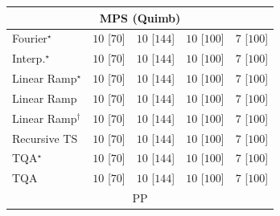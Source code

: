 \begin{tabular}{l|cccc|}
\cline{1-5}
\multicolumn{5}{c}{\rule{0pt}{8pt}MPS (Quimb)} \\
\midrule
Fourier$^\star$ & {\cellcolor[HTML]{00441B}} \color[HTML]{F1F1F1} $10$ [$70$] & {\cellcolor[HTML]{00441B}} \color[HTML]{F1F1F1} $10$ [$144$] & {\cellcolor[HTML]{00441B}} \color[HTML]{F1F1F1} $10$ [$100$] & {\cellcolor[HTML]{F7FCF5}} \color[HTML]{000000} $7$ [$100$] \\
Interp.$^\star$ & {\cellcolor[HTML]{00441B}} \color[HTML]{F1F1F1} $10$ [$70$] & {\cellcolor[HTML]{00441B}} \color[HTML]{F1F1F1} $10$ [$144$] & {\cellcolor[HTML]{00441B}} \color[HTML]{F1F1F1} $10$ [$100$] & {\cellcolor[HTML]{F7FCF5}} \color[HTML]{000000} $7$ [$100$] \\
Linear Ramp$^\star$ & {\cellcolor[HTML]{00441B}} \color[HTML]{F1F1F1} $10$ [$70$] & {\cellcolor[HTML]{00441B}} \color[HTML]{F1F1F1} $10$ [$144$] & {\cellcolor[HTML]{00441B}} \color[HTML]{F1F1F1} $10$ [$100$] & {\cellcolor[HTML]{F7FCF5}} \color[HTML]{000000} $7$ [$100$] \\
Linear Ramp & {\cellcolor[HTML]{00441B}} \color[HTML]{F1F1F1} $10$ [$70$] & {\cellcolor[HTML]{00441B}} \color[HTML]{F1F1F1} $10$ [$144$] & {\cellcolor[HTML]{00441B}} \color[HTML]{F1F1F1} $10$ [$100$] & {\cellcolor[HTML]{F7FCF5}} \color[HTML]{000000} $7$ [$100$] \\
Linear Ramp$^\dagger$ & {\cellcolor[HTML]{00441B}} \color[HTML]{F1F1F1} $10$ [$70$] & {\cellcolor[HTML]{00441B}} \color[HTML]{F1F1F1} $10$ [$144$] & {\cellcolor[HTML]{00441B}} \color[HTML]{F1F1F1} $10$ [$100$] & {\cellcolor[HTML]{F7FCF5}} \color[HTML]{000000} $7$ [$100$] \\
Recursive TS & {\cellcolor[HTML]{00441B}} \color[HTML]{F1F1F1} $10$ [$70$] & {\cellcolor[HTML]{00441B}} \color[HTML]{F1F1F1} $10$ [$144$] & {\cellcolor[HTML]{00441B}} \color[HTML]{F1F1F1} $10$ [$100$] & {\cellcolor[HTML]{F7FCF5}} \color[HTML]{000000} $7$ [$100$] \\
TQA$^\star$ & {\cellcolor[HTML]{00441B}} \color[HTML]{F1F1F1} $10$ [$70$] & {\cellcolor[HTML]{00441B}} \color[HTML]{F1F1F1} $10$ [$144$] & {\cellcolor[HTML]{00441B}} \color[HTML]{F1F1F1} $10$ [$100$] & {\cellcolor[HTML]{F7FCF5}} \color[HTML]{000000} $7$ [$100$] \\
TQA & {\cellcolor[HTML]{00441B}} \color[HTML]{F1F1F1} $10$ [$70$] & {\cellcolor[HTML]{00441B}} \color[HTML]{F1F1F1} $10$ [$144$] & {\cellcolor[HTML]{00441B}} \color[HTML]{F1F1F1} $10$ [$100$] & {\cellcolor[HTML]{F7FCF5}} \color[HTML]{000000} $7$ [$100$] \\
\cline{1-5}
\multicolumn{5}{c}{\rule{0pt}{8pt}PP} \\

\end{tabular}
